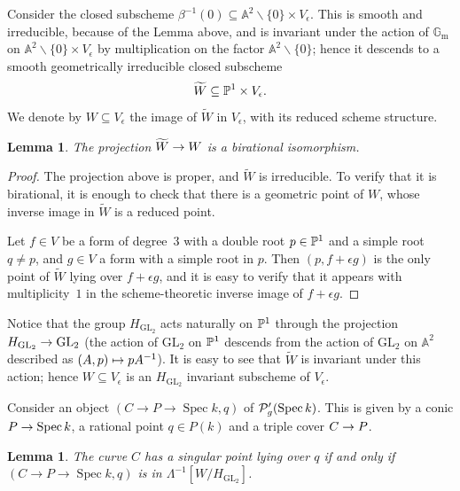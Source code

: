 \documentclass{amsart}
\numberwithin{equation}{section}
\numberwithin{subsection}{section}
\newtheorem{lemma}[theorem]{Lemma}
\theoremstyle{definition}
\theoremstyle{remark}
\renewcommand\AA{\mathbb{A}} \newcommand\BB{\mathbb{B}}
\newcommand\arr{\ifinner\to\else\longrightarrow\fi}
\newcommand\arrto{\ifinner\mapsto\else\longmapsto\fi}
\newcommand\spec{\operatorname{Spec}}
\renewcommand{\setminus}{\smallsetminus}
\newcommand{\GL}{\mathrm{GL}}
\newcommand{\gm}{\mathbb{G}_{\mathrm{m}}}
\newcommand\Hg{H_{\GL_2}}
\newcommand\Ve{V_{\epsilon}}
\begin{document}
Consider the closed subscheme $\beta^{-1}(0) \subseteq \AA^2 \setminus \{0\} \times \Ve$. This is smooth and irreducible, because of the Lemma above, and is invariant under the action of $\gm$ on $\AA^2 \setminus \{0\} \times \Ve$ by multiplication on the factor $\AA^2 \setminus \{0\}$; hence it descends to a smooth geometrically irreducible closed subscheme
   \[
   \widetilde{W} \subseteq \PP^1 \times \Ve.
   \]
We denote by $W\subseteq \Ve$ the image of $\widetilde{W}$ in $\Ve$, with its reduced scheme structure.

\begin{lemma}\label{lem:birational-1}
The projection $\widetilde{W} \arr W$ is a birational isomorphism.
\end{lemma}

\begin{proof}
The projection above is proper, and $\widetilde{W}$ is irreducible. To verify that it is birational, it is enough to check that there is a geometric point of $W$, whose inverse image in $\widetilde{W}$ is a reduced point.

Let $f \in V$ be a form of degree~$3$ with a double root $p \in \mathbb{P}^{1}$ and a simple root $q \neq p$, and $g\in V$ a form with a simple root in $p$. Then $(p, f+\epsilon g)$ is the only point of $\widetilde{W}$ lying over $f + \epsilon g$, and it is easy to verify that it appears with multiplicity~$1$ in the scheme-theoretic inverse image of $f+ \epsilon g$.
\end{proof}

Notice that the group $\Hg$ acts naturally on $\mathbb{P}^{1}$ through the projection $\Hg \arr \GL_{2}$ (the action of $\GL_{2}$ on $\mathbb{P}^{1}$ descends from the action of $\GL_{2}$ on $\AA^{2}$ described as $(A, p) \arrto pA^{-1}$). It is easy to see that $\widetilde{W}$ is invariant under this action; hence $W \subseteq \Ve$ is an $\Hg$ invariant subscheme of $\Ve$.

Consider an object $(C \to P \to \spec k, q)$ of $\cP'_{g}(\spec k)$. This is given by a conic $P \arr \spec k$, a rational point $q \in P(k)$ and a triple cover $C \arr P$. 

\begin{lemma}\label{lem:singular-points}
The curve $C$ has a singular point lying over $q$ if and only if $(C \to P \to \spec k, q)$ is in $\Lambda^{-1}[W/\Hg]$.
\end{lemma}
\end{document}
